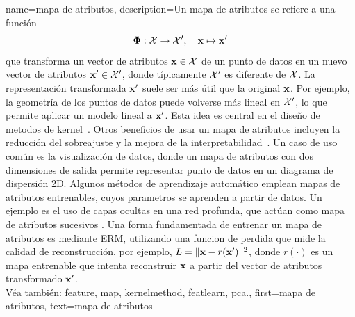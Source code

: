 
	{name={mapa de atributos}, 
		description={Un mapa de atributos se refiere a una función
			$$
			{\bf \Phi}: \mathcal{X} \rightarrow \mathcal{X}', \quad {\bf x} \mapsto {\bf x}'
			$$
			que transforma un vector de atributos ${\bf x} \in \mathcal{X}$ de un punto de datos
			en un nuevo vector de atributos ${\bf x}' \in \mathcal{X}'$, donde típicamente 
			$\mathcal{X}'$ es diferente de $\mathcal{X}$.
			La representación transformada ${\bf x}'$ suele ser más útil que la original ${\bf x}$. 
			Por ejemplo, la geometría de los puntos de datos puede volverse más lineal en $\mathcal{X}'$, 
			lo que permite aplicar un modelo lineal a ${\bf x}'$. 
			Esta idea es central en el diseño de metodos de kernel~\cite{LearningKernelsBook}.
			Otros beneficios de usar un mapa de atributos incluyen la reducción del sobreajuste
			y la mejora de la interpretabilidad~\cite{Ribeiro2016}. Un caso de uso común es la visualización 
			de datos, donde un mapa de atributos con dos dimensiones de salida permite representar 
			punto de datos en un diagrama de dispersión 2D. Algunos métodos de aprendizaje automático emplean mapas de atributos
			entrenables, cuyos parametros se aprenden a partir de datos. Un ejemplo es el uso 
			de capas ocultas en una red profunda, que actúan como mapa de atributos sucesivos 
			\cite{MallatUnderstandingDeepLearning}. Una forma fundamentada de entrenar un mapa de atributos
			es mediante ERM, utilizando una funcion de perdida que mide la calidad de reconstrucción, 
			por ejemplo, $L = \|{\bf x} - r({\bf x}')\|^2$, donde $r(\cdot)$ es un mapa 
			entrenable que intenta reconstruir ${\bf x}$ a partir del vector de atributos transformado ${\bf x}'$.
			\\
			Véa también: \gls{feature}, \gls{map}, \gls{kernelmethod}, \gls{featlearn}, \gls{pca}.},
		first={mapa de atributos},
		text={mapa de atributos} 
	}
	
